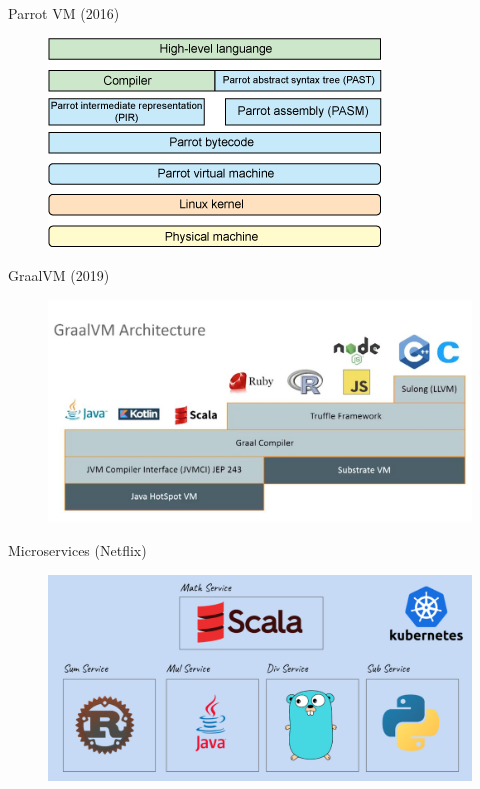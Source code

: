 \documentclass[aspectratio=169]{beamer}
\begin{document}
\begin{frame}{Parrot VM (2016)}

	\begin{figure}
    			\centering
    			\includegraphics[width=0.6\linewidth]{Images/parrot}
    \end{figure}

\end{frame}

\begin{frame}{GraalVM (2019)}

	\begin{figure}
		\centering
		\includegraphics[width=\linewidth]{Images/graalvm}
	\end{figure}

\end{frame}

\begin{frame}{Microservices (Netflix)}

	\begin{figure}
		\centering
		\includegraphics[width=\linewidth]{Images/microservices}
	\end{figure}

\end{frame}
\end{document}
